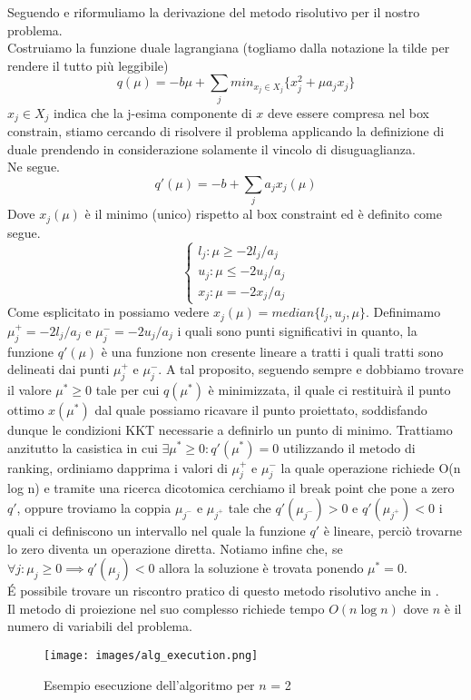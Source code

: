 \documentclass[12pt]{extarticle}
\begin{document}
Seguendo \cite{Jeong2014IndefiniteKS} e \cite{PATRIKSSON20081} riformuliamo la derivazione del metodo risolutivo per il nostro problema.\\
Costruiamo la funzione duale lagrangiana (togliamo dalla notazione la tilde per rendere il tutto più leggibile)
\[q(\mu) = -b\mu + \sum_j { min_{x_j \in X_j} \{x_j^2 + \mu a_j x_j\}}\]
$x_j \in X_j$ indica che la j-esima componente di $x$ deve essere compresa nel box constrain, stiamo cercando di risolvere il problema applicando la definizione di duale prendendo in considerazione solamente il vincolo di disuguaglianza.\\
Ne segue.
\[q'(\mu) = -b + \sum_j { a_j x_j(\mu)}\]
Dove $x_j(\mu)$ è il minimo (unico) rispetto al box constraint ed è definito come segue.
\begin{equation}
    \begin{cases}
      l_j : \mu \geq -2l_j/a_j\\
      u_j : \mu \leq -2u_j/a_j\\
      x_j : \mu = -2x_j/a_j
    \end{cases}
\end{equation}
Come esplicitato in \cite{Jeong2014IndefiniteKS} possiamo vedere $x_j(\mu) = median \{l_j, u_j, \mu\}$. Definimamo $\mu_j^+ = -2l_j/a_j$ e $\mu_j^- = -2u_j/a_j$ i quali sono punti significativi in quanto, la funzione $q'(\mu)$ è una funzione non cresente lineare a tratti i quali tratti sono delineati dai punti $\mu_j^+$ e $\mu_j^-$. A tal proposito, seguendo sempre \cite{Jeong2014IndefiniteKS} e \cite{PATRIKSSON20081} dobbiamo trovare il valore $\mu^* \geq 0$ tale per cui $q(\mu^*)$ è minimizzata, il quale ci restituirà il punto ottimo $x(\mu^*)$ dal quale possiamo ricavare il punto proiettato, soddisfando dunque le condizioni KKT necessarie a definirlo un punto di minimo. Trattiamo anzitutto la casistica in cui $\exists \mu^* \geq 0 : q'(\mu^*) = 0$ utilizzando il metodo di ranking, ordiniamo dapprima i valori di $\mu_j^+$ e $\mu_j^-$ la quale operazione richiede O(n log n) e tramite una ricerca dicotomica cerchiamo il break point che pone a zero $q'$, oppure troviamo la coppia $\mu_{j^-}$ e $\mu_{j^+}$ tale che $q'(\mu_{j^-}) > 0$ e $q'(\mu_{j^+}) < 0$ i quali ci definiscono un intervallo nel quale la funzione $q'$ è lineare, perciò trovarne lo zero diventa un operazione diretta. Notiamo infine che, se $\forall j : \mu_j \geq 0 \implies q'(\mu_j) < 0$ allora la soluzione è trovata ponendo $\mu^*  = 0$.\\
\'E possibile trovare un riscontro pratico di questo metodo risolutivo anche in \cite{bretthauer1995nonlinear}.\\
Il metodo di proiezione nel suo complesso richiede tempo $O(n \log n)$ dove $n$ è il numero di variabili del problema.
\begin{figure}[H]
    \centering
    \texttt{[image: images/alg\_execution.png]}
    \caption{Esempio esecuzione dell'algoritmo per $n$ = 2}
    \label{fig:execution}
\end{figure}
\end{document}

